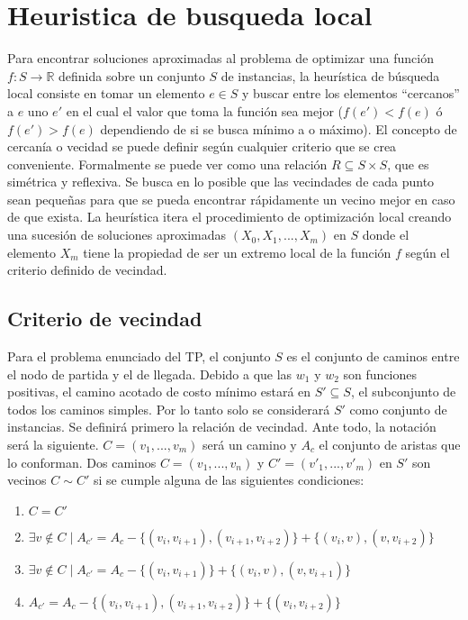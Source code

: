 \section{Heuristica de busqueda local}

Para encontrar soluciones aproximadas al problema de optimizar una funci\'on $f:S \rightarrow \mathbb{R}$ definida sobre un conjunto $S$ de instancias, la heur\'istica de b\'usqueda local consiste en tomar un elemento $e \in S$ y buscar entre los elementos ``cercanos'' a $e$ uno $e'$ en el cual el valor que toma la funci\'on sea mejor ($f(e') < f(e)$ \'o $f(e') > f(e)$ dependiendo de si se busca m\'inimo a o m\'aximo).
El concepto de cercan\'ia o vecidad se puede definir seg\'un cualquier criterio que se crea conveniente. Formalmente se puede ver como una relaci\'on $R \subseteq S \times S$, que es sim\'etrica y reflexiva. Se busca en lo posible que las vecindades de cada punto sean peque\~nas para que se pueda encontrar r\'apidamente un vecino mejor en caso de que exista.
La heur\'istica itera el procedimiento de optimizaci\'on local creando una sucesi\'on de soluciones aproximadas $(X_0, X_1, ... , X_m)$ en $S$ donde el elemento $X_m$ tiene la propiedad de ser un extremo local de la funci\'on $f$ seg\'un el criterio definido de vecindad.


\subsection{Criterio de vecindad}
Para el problema enunciado del TP, el conjunto $S$ es el conjunto de caminos entre el nodo de partida y el de llegada. Debido a que las $w_1$ y $w_2$ son funciones positivas, el camino acotado de costo m\'inimo estar\'a en $S' \subseteq S$, el subconjunto de todos los caminos simples. Por lo tanto solo se considerar\'a $S'$ como conjunto de instancias.
Se definir\'a primero la relaci\'on de vecindad. Ante todo, la notaci\'on ser\'a la siguiente. $C = (v_1, ..., v_m)$ ser\'a un camino y $A_c$ el conjunto de aristas que lo conforman. Dos caminos $C = (v_1, ... , v_n)$ y $C' = (v'_1, ... , v'_m)$ en $S'$ son vecinos $C \sim C'$ si se cumple alguna de las siguientes condiciones:

\begin{enumerate}
    \item $C = C'$
    \item $ \exists v \notin C \mid A_{c'} = A_c - \{(v_i,v_{i+1}),(v_{i+1},v_{i+2})\} + \{(v_i,v),(v,v_{i+2})\}$
    \item $ \exists v \notin C \mid A_{c'} = A_c - \{(v_i,v_{i+1})\} + \{(v_i,v),(v,v_{i+1})\}$
    \item $A_{c'} = A_c - \{(v_i,v_{i+1}), (v_{i+1},v_{i+2})\} + \{(v_i,v_{i+2})\}$

\end{enumerate}

